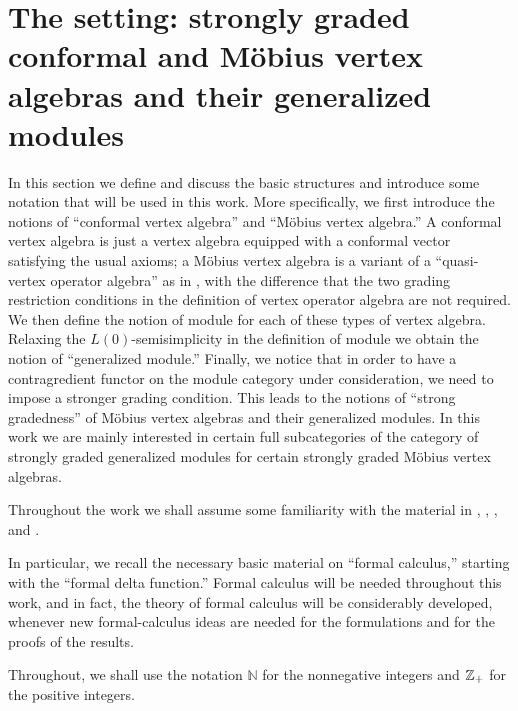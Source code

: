 \documentclass[12pt]{article}
\begin{document}
\newpage

\setcounter{section}{1}
\setcounter{equation}{0}
\setcounter{rema}{0}

\section{The setting: strongly graded conformal and M\"obius vertex
algebras and their generalized modules}

In this section we define and discuss the basic structures and
introduce some notation that will be used in this work. More
specifically, we first introduce the notions of ``conformal vertex
algebra'' and ``M\"obius vertex algebra.''  A conformal vertex algebra
is just a vertex algebra equipped with a conformal vector satisfying
the usual axioms; a M\"obius vertex algebra is a variant of a
``quasi-vertex operator algebra'' as in \cite{FHL}, with the
difference that the two grading restriction conditions in the
definition of vertex operator algebra are not required. We then define
the notion of module for each of these types of vertex algebra.
Relaxing the $L(0)$-semisimplicity in the definition of module we
obtain the notion of ``generalized module.''  Finally, we notice that
in order to have a contragredient functor on the module category under
consideration, we need to impose a stronger grading condition.  This
leads to the notions of ``strong gradedness'' of M\"obius vertex
algebras and their generalized modules. In this work we are mainly
interested in certain full subcategories of the category of strongly
graded generalized modules for certain strongly graded M\"obius vertex
algebras.

Throughout the work we shall assume some familiarity with the material
in \cite{B}, \cite{FLM2}, \cite{FHL}, \cite{DL} and \cite{LL}.

In particular, we recall the necessary basic material on ``formal
calculus,'' starting with the ``formal delta function.''  Formal
calculus will be needed throughout this work, and in fact, the theory
of formal calculus will be considerably developed, whenever new
formal-calculus ideas are needed for the formulations and for the
proofs of the results.

Throughout, we shall use the notation ${\mathbb N}$ for the nonnegative
integers and $\mathbb{Z}_{+}$ for the positive integers.
\end{document}
